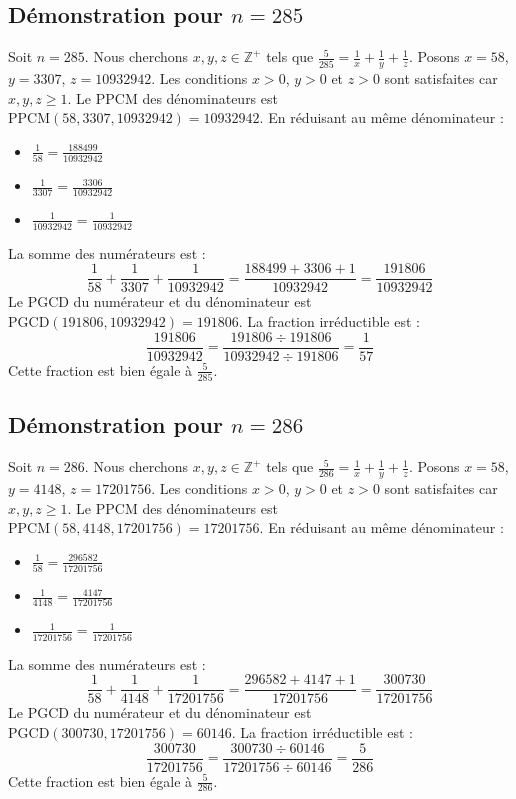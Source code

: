 \documentclass[11pt,a4paper]{article}
\begin{document}
\subsection{Démonstration pour $n = 285$}
Soit $n = 285$. Nous cherchons $x, y, z \in \mathbb{Z}^{+}$ tels que $\frac{5}{285} = \frac{1}{x} + \frac{1}{y} + \frac{1}{z}$.
Posons $x = 58$, $y = 3307$, $z = 10932942$.
Les conditions $x > 0$, $y > 0$ et $z > 0$ sont satisfaites car $x, y, z \geq 1$.
Le PPCM des dénominateurs est $\text{PPCM}(58, 3307, 10932942) = 10932942$.
En réduisant au même dénominateur :
\begin{itemize}
    \item $\frac{1}{58} = \frac{188499}{10932942}$
    \item $\frac{1}{3307} = \frac{3306}{10932942}$
    \item $\frac{1}{10932942} = \frac{1}{10932942}$
\end{itemize}
La somme des numérateurs est :
$$ \frac{1}{58} + \frac{1}{3307} + \frac{1}{10932942} = \frac{188499 + 3306 + 1}{10932942} = \frac{191806}{10932942} $$
Le PGCD du numérateur et du dénominateur est $\text{PGCD}(191806, 10932942) = 191806$.
La fraction irréductible est :
$$ \frac{191806}{10932942} = \frac{191806 \div 191806}{10932942 \div 191806} = \frac{1}{57} $$
Cette fraction est bien égale à $\frac{5}{285}$.

\subsection{Démonstration pour $n = 286$}
Soit $n = 286$. Nous cherchons $x, y, z \in \mathbb{Z}^{+}$ tels que $\frac{5}{286} = \frac{1}{x} + \frac{1}{y} + \frac{1}{z}$.
Posons $x = 58$, $y = 4148$, $z = 17201756$.
Les conditions $x > 0$, $y > 0$ et $z > 0$ sont satisfaites car $x, y, z \geq 1$.
Le PPCM des dénominateurs est $\text{PPCM}(58, 4148, 17201756) = 17201756$.
En réduisant au même dénominateur :
\begin{itemize}
    \item $\frac{1}{58} = \frac{296582}{17201756}$
    \item $\frac{1}{4148} = \frac{4147}{17201756}$
    \item $\frac{1}{17201756} = \frac{1}{17201756}$
\end{itemize}
La somme des numérateurs est :
$$ \frac{1}{58} + \frac{1}{4148} + \frac{1}{17201756} = \frac{296582 + 4147 + 1}{17201756} = \frac{300730}{17201756} $$
Le PGCD du numérateur et du dénominateur est $\text{PGCD}(300730, 17201756) = 60146$.
La fraction irréductible est :
$$ \frac{300730}{17201756} = \frac{300730 \div 60146}{17201756 \div 60146} = \frac{5}{286} $$
Cette fraction est bien égale à $\frac{5}{286}$.
\end{document}
